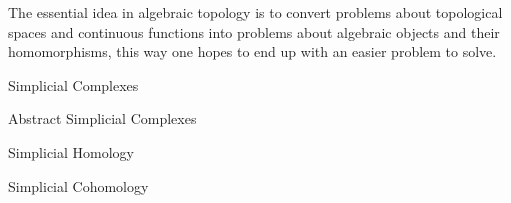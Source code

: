 \documentclass[../main.tex]{subfiles}
\begin{document}
    The essential idea in algebraic topology is to convert problems about topological spaces and continuous functions into
    problems about algebraic objects and their homomorphisms, this way one hopes to end up with an easier problem to solve. 
    \begin{section}{Simplicial Complexes} 
            
    \end{section}
    \begin{section}{Abstract Simplicial Complexes} 
            
    \end{section}
    \begin{section}{Simplicial Homology}
            
    \end{section}
    \begin{section}{Simplicial Cohomology}
         
    \end{section}
\end{document}
